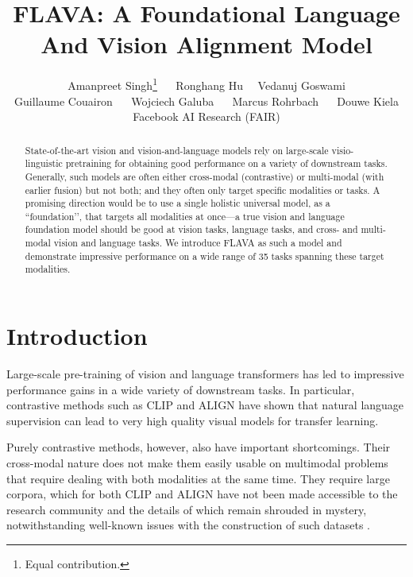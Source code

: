 \documentclass[10pt,twocolumn,letterpaper]{article}
\begin{document}
\title{FLAVA: A Foundational Language And Vision Alignment Model}

\newcommand*\samethanks[1][\value{footnote}]{\footnotemark[#1]}
\author{
Amanpreet Singh\thanks{Equal contribution.} $\quad$ Ronghang Hu\samethanks $\quad$ Vedanuj Goswami\samethanks\\
\vspace{0.25em}
Guillaume Couairon $\quad$ Wojciech Galuba $\quad$ Marcus Rohrbach $\quad$ Douwe Kiela \\
\vspace{-0.5em}
Facebook AI Research (FAIR) \\
}
\maketitle

\vspace{-1em}
\begin{abstract}
\vspace{-0.5em}
State-of-the-art vision and vision-and-language models rely on large-scale visio-linguistic pretraining for obtaining good performance on a variety of downstream tasks. Generally, such models are often either cross-modal (contrastive) or multi-modal (with earlier fusion) but not both; and they often only target specific modalities or tasks. A promising direction would be to use a single holistic universal model, as a ``foundation’’, that targets all modalities at once---a true vision and language foundation model should be good at vision tasks, language tasks, and cross- and multi-modal vision and language tasks. We introduce FLAVA as such a model and demonstrate impressive performance on a wide range of 35 tasks spanning these target modalities.
\end{abstract}

\vspace{-1em}
\section{Introduction}

Large-scale pre-training of vision and language transformers has led to impressive performance gains in a wide variety of downstream tasks. In particular, contrastive methods such as CLIP \cite{radford2021learning} and ALIGN \cite{jia2021scaling} have shown that natural language supervision can lead to very high quality visual models for transfer learning.

Purely contrastive methods, however, also have important shortcomings. Their cross-modal nature does not make them easily usable on multimodal problems that require dealing with both modalities at the same time. They require large corpora, which for both CLIP and ALIGN have not been made accessible to the research community and the details of which remain shrouded in mystery, notwithstanding well-known issues with the construction of such datasets \cite{birhane2021multimodal}.
\end{document}
